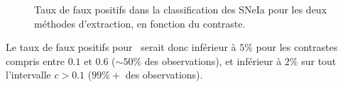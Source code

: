 \documentclass[../main/main.tex]{subfiles}
\begin{document}
\begin{figure}[ht]
  \centering
  \caption[Taux de faux positifs dans la classification des SNeIa.]{Taux de
    faux positifs dans la classification des SNeIa pour les deux
    méthodes d'extraction, en fonction du contraste.}
  \label{fig:falsepositivesIa}
\end{figure}

Le taux de faux positifs pour \hypergal\ serait donc inférieur à $5\%$
pour les contrastes compris entre $0.1$ et $0.6$ ($\sim50\%$ des observations), et inférieur à $2\%$
sur tout l'intervalle $c>0.1$ ($99\%+$ des observations).

%
%
\end{document}
